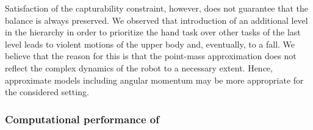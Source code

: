 Satisfaction of the capturability constraint, however, does not guarantee that
the balance is always preserved. We observed that introduction of an additional
level in the hierarchy in order to prioritize the hand task over other tasks of
the last level leads to violent motions of the upper body and, eventually, to a
fall. We believe that the reason for this is that the point-mass approximation
does not reflect the complex dynamics of the robot to a necessary extent.
Hence, approximate models including angular momentum may be more appropriate
for the considered setting.




\subsubsection{Computational performance of }\label{sec.walk_performance}

